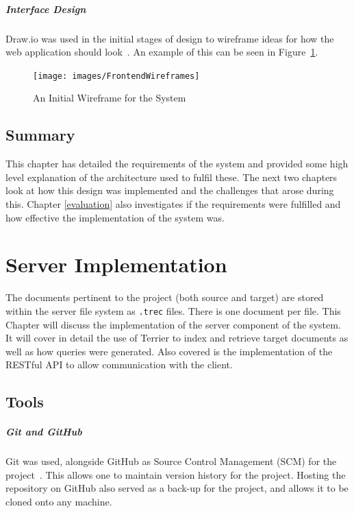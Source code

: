 \documentclass{l4proj}
\newcommand{\code}[1]{\texttt{#1}}
\begin{document}
\paragraph{Interface Design}
Draw.io was used in the initial stages of design to wireframe ideas for how the web application should look~\cite{drawio}. An example of this can be seen in Figure~\ref{wireframes}.
\begin{figure}[H]
\centering
\texttt{[image: images/FrontendWireframes]}
\caption{An Initial Wireframe for the System}
\label{wireframes}
\end{figure}

\section{Summary}
This chapter has detailed the requirements of the system and provided some high level explanation of the architecture used to fulfil these.
The next two chapters look at how this design was implemented and the challenges that arose during this. Chapter \ref{evaluation} also investigates if the requirements were fulfilled and how effective the implementation of the system was.

\chapter{Server Implementation} \label{serverimplementation}
The documents pertinent to the project (both source and target) are stored within the server file system as \code{.trec} files. There is one document per file.
This Chapter will discuss the implementation of the server component of the system. It will cover in detail the use of Terrier to index and retrieve target documents as well as how queries were generated. Also covered is the implementation of the RESTful API to allow communication with the client.

\section{Tools}
\paragraph{Git and GitHub}
Git was used, alongside GitHub as Source Control Management (SCM) for the project~\cite{git,github}. This allows one to maintain version history for the project. Hosting the repository on GitHub also served as a back-up for the project, and allows it to be cloned onto any machine.
\end{document}
